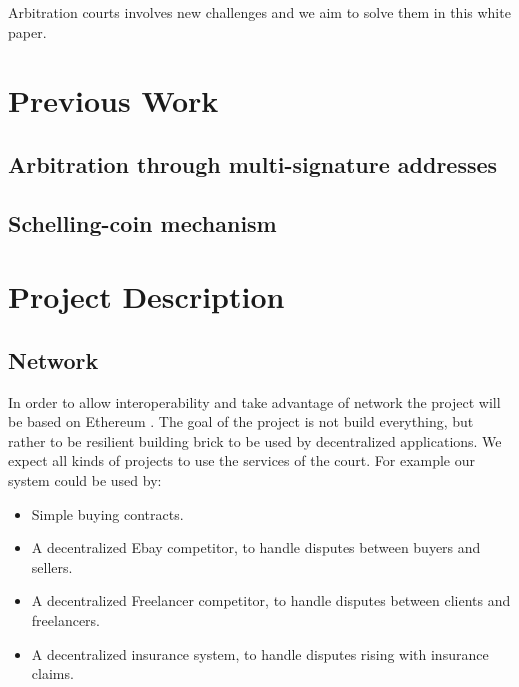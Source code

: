 \documentclass[12 pt]{article}
\begin{document}
Arbitration courts involves new challenges and we aim to solve them in this white paper.



\section{Previous Work}

\subsection{Arbitration through multi-signature addresses}

\subsection{Schelling-coin mechanism}
\cite{schellingcoin}
\cite{truthcoin}

\section{Project Description}

\subsection{Network}

In order to allow interoperability and take advantage of network the project will be based on Ethereum \cite{ethereum}.
The goal of the project is not build everything, but rather to be resilient building brick to be used by decentralized applications. We expect all kinds of projects to use the services of the court. For example our system could be used by:
\begin{itemize}
\item Simple buying contracts.
\item A decentralized Ebay competitor, to handle disputes between buyers and sellers.
\item A decentralized Freelancer competitor, to handle disputes between clients and freelancers.
\item A decentralized insurance system, to handle disputes rising with insurance claims.
\end{itemize}
\end{document}
